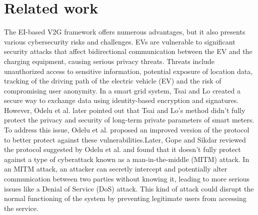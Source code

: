 \documentclass[3p,times,onecolumn]{elsarticle}
\begin{document}
\section{Related work}The EI-based V2G framework offers numerous advantages, but it also presents various cybersecurity risks and challenges. EVs are vulnerable to significant security attacks that affect bidirectional communication between the EV and the charging equipment, causing serious privacy threats. Threats include unauthorized access to sensitive information, potential exposure of location data, tracking of the driving path of the electric vehicle (EV) and the risk of compromising user anonymity. In a smart grid system, Tsai and Lo \cite{GT6} created a secure way to exchange data using identity-based encryption and signatures. However, Odelu et al. \cite{GT7} later pointed out that Tsai and Lo's method didn't fully protect the privacy and security of long-term private parameters of smart meters. To address this issue, Odelu et al. \cite{GT7} proposed an improved version of the protocol to better protect against these vulnerabilities.Later, Gope and Sikdar \cite{GT11} reviewed the protocol suggested by Odelu et al. \cite{GT7} and found that it doesn't fully protect against a type of cyberattack known as a man-in-the-middle (MITM) attack. In an MITM attack, an attacker can secretly intercept and potentially alter communication between two parties without knowing it, leading to more serious issues like a Denial of Service (DoS) attack. This kind of attack could disrupt the normal functioning of the system by preventing legitimate users from accessing the service. 
\end{document}
